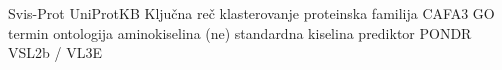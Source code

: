 
Svis-Prot
UniProtKB 
Ključna reč
klasterovanje
proteinska familija
CAFA3
GO termin
ontologija
aminokiselina
(ne) standardna kiselina
prediktor
PONDR VSL2b / VL3E 
